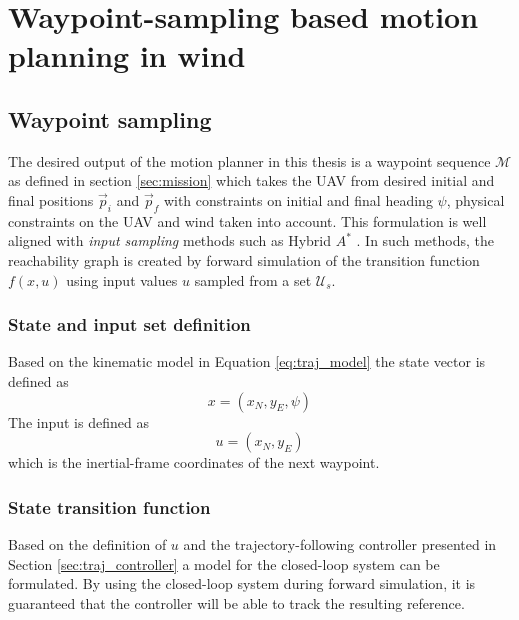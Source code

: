 \chapter{Waypoint-sampling based motion planning in wind}\label{cha:motion_planning_fw}
\section{Waypoint sampling}
The desired output of the motion planner in this thesis is a waypoint sequence $\mathcal{M}$ as defined in section \ref{sec:mission}
which takes the UAV from desired initial and final positions $\vec{p}_i$ and $\vec{p}_f$ with constraints on initial and final heading $\psi$, 
physical constraints on the UAV and wind taken into account. This formulation is well aligned with \textit{input sampling} methods such as Hybrid $A^*$ \cite{hybrid_astar}. 
In such methods, the reachability graph is created by forward simulation of the transition function $f(x, u)$ using input values $u$ sampled from a 
set $\mathcal{U}_s$. 

\subsection{State and input set definition}
Based on the kinematic model in Equation \eqref{eq:traj_model} the state vector is defined as
\begin{equation}
    x=(x_N, y_E, \psi)
\end{equation}
The input is defined as 
\begin{equation}
    u=(x_N, y_E)
\end{equation}
which is the inertial-frame coordinates of the next waypoint.
\subsection{State transition function}
Based on the definition of $u$ and the trajectory-following controller presented in Section \ref{sec:traj_controller} 
a model for the closed-loop system can be formulated. By using the closed-loop system during forward simulation, 
it is guaranteed that the controller will be able to track the resulting reference. 

